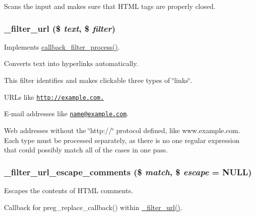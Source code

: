 Scans the input and makes sure that HTML tags are properly closed. \hypertarget{group__standard__filters_ga3014977a8aa365044b11f94abf04f313}{
\subsubsection[{\_\-filter\_\-url}]{\setlength{\rightskip}{0pt plus 5cm}\_\-filter\_\-url (\$ {\em text}, \/  \$ {\em filter})}}
\label{group__standard__filters_ga3014977a8aa365044b11f94abf04f313}
Implements \hyperlink{group__callbacks_ga5f82accd878d144a22ea2dfec253f91d}{callback\_\-filter\_\-process()}.

Converts text into hyperlinks automatically.

This filter identifies and makes clickable three types of \char`\"{}links\char`\"{}.
\begin{DoxyItemize}
\item URLs like \href{http://example.com.}{\tt http://example.com.}
\item E-\/mail addresses like \href{mailto:name@example.com}{\tt name@example.com}.
\item Web addresses without the \char`\"{}http://\char`\"{} protocol defined, like www.example.com. Each type must be processed separately, as there is no one regular expression that could possibly match all of the cases in one pass. 
\end{DoxyItemize}\hypertarget{group__standard__filters_ga3812d3d44a81e993385890149dc186be}{
\subsubsection[{\_\-filter\_\-url\_\-escape\_\-comments}]{\setlength{\rightskip}{0pt plus 5cm}\_\-filter\_\-url\_\-escape\_\-comments (\$ {\em match}, \/  \$ {\em escape} = {\ttfamily NULL})}}
\label{group__standard__filters_ga3812d3d44a81e993385890149dc186be}
Escapes the contents of HTML comments.

Callback for preg\_\-replace\_\-callback() within \hyperlink{group__standard__filters_ga3014977a8aa365044b11f94abf04f313}{\_\-filter\_\-url()}.


